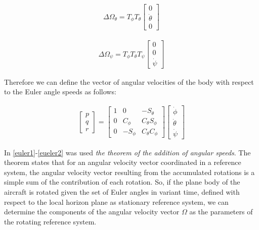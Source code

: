 \begin{gather}
    \Delta \Omega_{\theta}
    =
    T_{\phi} T_{\theta}
    \begin{bmatrix}
    0\\
    \dot \theta\\
    0
    \end{bmatrix}
\end{gather}

\begin{gather}
\label{eueler2}
    \Delta \Omega_{\psi}
    =
    T_{\phi} T_{\theta} T_{\psi}
    \begin{bmatrix}
    0\\
    0\\
    \dot \psi
    \end{bmatrix}
\end{gather}

Therefore we can define the vector of angular velocities of the body with respect to the Euler angle speeds as follows:

\begin{gather}
\label{velocidad angular aeronave}
    \begin{bmatrix}
    p\\
    q\\
    r
    \end{bmatrix}
    =
    \begin{bmatrix}
    1 & 0 & -S_{\theta}\\
    0 & C_{\phi} & C_{\theta} S_{\phi}\\
    0 & -S_{\phi} & C_{\theta} C_{\phi}
    \end{bmatrix}
    \begin{bmatrix}
    \dot \phi\\
    \dot \theta\\
    \dot \psi
    \end{bmatrix}
\end{gather}

In \ref{euler1}-\ref{eueler2} was used \textit{the theorem of the addition of angular speeds}. The theorem states that for an angular velocity vector coordinated in a reference system, the angular velocity vector resulting from the accumulated rotations is a simple sum of the contribution of each rotation. So, if the plane body of the aircraft is rotated given the set of Euler angles in variant time, defined with respect to the local horizon plane as stationary reference system, we can determine the components of the angular velocity vector $\Omega$ as the parameters of the rotating reference system.

